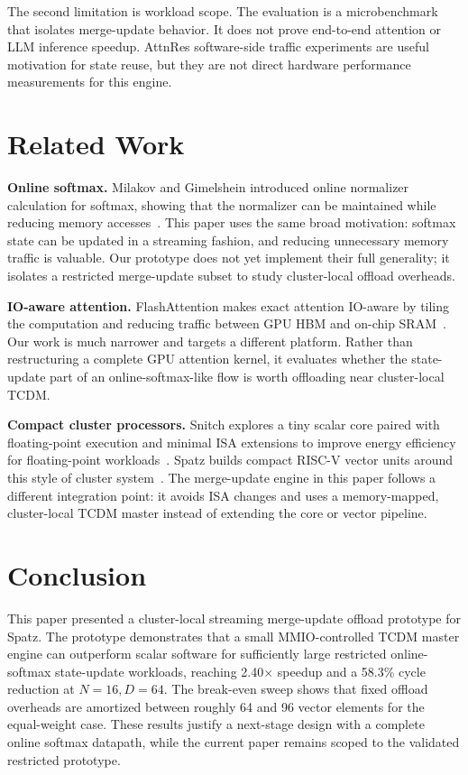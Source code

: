 \documentclass[conference]{IEEEtran}
\begin{document}
The second limitation is workload scope. The evaluation is a microbenchmark
that isolates merge-update behavior. It does not prove end-to-end attention or
LLM inference speedup. AttnRes software-side traffic experiments are useful
motivation for state reuse, but they are not direct hardware performance
measurements for this engine.

\section{Related Work}

\textbf{Online softmax.}
Milakov and Gimelshein introduced online normalizer calculation for softmax,
showing that the normalizer can be maintained while reducing memory
accesses~\cite{online-softmax2018}. This paper uses the same broad motivation:
softmax state can be updated in a streaming fashion, and reducing unnecessary
memory traffic is valuable. Our prototype does not yet implement their full
generality; it isolates a restricted merge-update subset to study cluster-local
offload overheads.

\textbf{IO-aware attention.}
FlashAttention makes exact attention IO-aware by tiling the computation and
reducing traffic between GPU HBM and on-chip SRAM~\cite{flashattention2022}.
Our work is much narrower and targets a different platform. Rather than
restructuring a complete GPU attention kernel, it evaluates whether the
state-update part of an online-softmax-like flow is worth offloading near
cluster-local TCDM.

\textbf{Compact cluster processors.}
Snitch explores a tiny scalar core paired with floating-point execution and
minimal ISA extensions to improve energy efficiency for floating-point
workloads~\cite{snitch2020}. Spatz builds compact RISC-V vector units around
this style of cluster system~\cite{spatz2023}. The merge-update engine in this
paper follows a different integration point: it avoids ISA changes and uses a
memory-mapped, cluster-local TCDM master instead of extending the core or vector
pipeline.

\section{Conclusion}

This paper presented a cluster-local streaming merge-update offload prototype
for Spatz. The prototype demonstrates that a small MMIO-controlled TCDM master
engine can outperform scalar software for sufficiently large restricted
online-softmax state-update workloads, reaching 2.40$\times$ speedup and a
58.3\% cycle reduction at $N=16,D=64$. The break-even sweep shows that fixed
offload overheads are amortized between roughly 64 and 96 vector elements for
the equal-weight case. These results justify a next-stage design with a
complete online softmax datapath, while the current paper remains scoped to the
validated restricted prototype.



\end{document}
